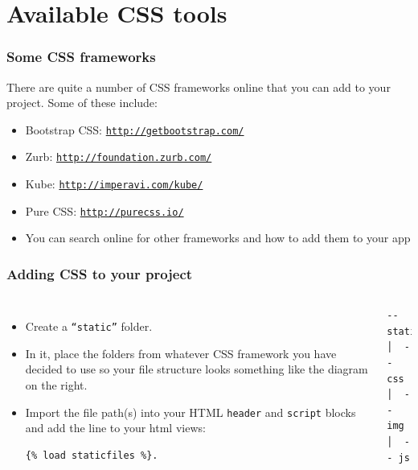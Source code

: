 \documentclass[10pt,t,xcolor=dvipsnames]{beamer}
\begin{document}
\section{Available CSS tools}
\begin{frame}[fragile]
\frametitle{Some CSS frameworks}
\pause
There are quite a number of CSS frameworks online that you can add to your project. Some of these include:
\begin{itemize}[<+->]
\item Bootstrap CSS: \texttt{\href{bootstrap_link}{http://getbootstrap.com/}}
\item Zurb: \texttt{\href{zurb_link}{http://foundation.zurb.com/}}
\item Kube: \texttt{\href{kube_link}{http://imperavi.com/kube/}}
\item Pure CSS: \texttt{\href{pure_link}{http://purecss.io/}}
\item You can search online for other frameworks and how to add them to your app
\end{itemize}
\end{frame}
\begin{frame}[fragile]
\frametitle{Adding CSS to your project}
\pause
\begin{columns}[l]
\begin{itemize}[<+->]
\item Create a \texttt{``static''} folder.
\item In it, place the folders from whatever CSS framework you have decided to use so your file structure looks something like the diagram on the right.
\item Import the file path(s) into your HTML \texttt{header} and \texttt{script} blocks and add the line to your html views:
\begin{lstlisting}
{% load staticfiles %}.
\end{lstlisting}
\end{itemize}
\pause
{}
\begin{lstlisting}
-- static
│  -- css
│  -- img
│  -- js
\end{lstlisting}
\end{columns}
\end{frame}
\end{document}
